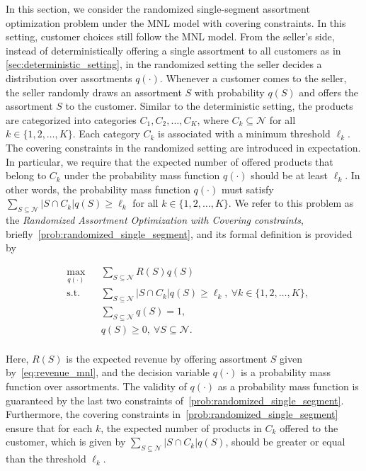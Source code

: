 \documentclass[msom,non-blindrev]{informs3} %
\theoremstyle{definition}
\begin{document}
In this section, we consider the randomized single-segment assortment optimization problem under the MNL model with covering constraints. In this setting, customer choices still follow the MNL model. From the seller's side, instead of deterministically offering a single assortment to all customers as in \cref{sec:deterministic_setting}, in the randomized setting the seller decides a distribution over assortments $q(\cdot)$. Whenever a customer comes to the seller, the seller randomly draws an assortment $S$ with probability  $q(S)$ and offers the assortment $S$ to the customer. Similar to the deterministic setting, the products are categorized into  categories $C_1,C_2,\dots,C_K$, where $C_k\subseteq\mathcal{N}$ for all $k\in\{1,2,\dots,K\}$. Each category $C_k$ is associated with a minimum threshold $\ell_k$. The covering constraints in the randomized setting are introduced in expectation. In particular, we require that the expected number of offered products that belong to $C_k$ under the probability mass function $q(\cdot)$ should be at least $\ell_k$. In other words, the probability mass function $q(\cdot)$ must satisfy $\sum_{S\subseteq\mathcal{N}}|S\cap C_k|q(S)\geq \ell_k$ for all $k\in\{1,2,\dots,K\}$. We refer to this problem as the \textit{Randomized Assortment Optimization with Covering constraints}, briefly~\eqref{prob:randomized_single_segment}, and its formal definition is provided by

\begin{equation}
\label{prob:randomized_single_segment}
\tag{RAOC}
\begin{aligned}
& \max_{q(\cdot)} && \sum_{S\subseteq\mathcal{N}} R(S)q(S) \\
& \text{s.t.} && \sum_{S\subseteq\mathcal{N}}|S\cap C_k|q(S)\geq \ell_k,\ \forall k\in\{1,2,\dots,K\}, \\
&&& \sum_{S\subseteq\mathcal{N}}q(S)=1,\\
&&& q(S)\geq 0,\ \forall S\subseteq\mathcal{N}. \\
\end{aligned}
\end{equation}

Here, $R(S)$ is the expected revenue by offering assortment $S$ given by~\eqref{eq:revenue_mnl}, and the decision variable $q(\cdot)$ is a probability mass function over assortments. The validity of $q(\cdot)$ as a probability mass function is guaranteed by the last two constraints of~\eqref{prob:randomized_single_segment}.
Furthermore, the covering constraints in~\eqref{prob:randomized_single_segment} ensure that for each $k$,  the expected number of products in $C_k$  offered to the customer, which is given  by $\sum_{S\subseteq\mathcal{N}}|S\cap C_k|q(S)$, should be greater or equal than the  threshold $\ell_k$. %
\end{document}
